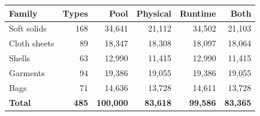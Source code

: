 \begin{tabular}{lrrrrr}
\toprule
Family & Types & Pool & Physical & Runtime & Both \\
\midrule
Soft solids & 168 & 34,641 & 21,112 & 34,502 & 21,103 \\
Cloth sheets & 89 & 18,347 & 18,308 & 18,097 & 18,064 \\
Shells & 63 & 12,990 & 11,415 & 12,990 & 11,415 \\
Garments & 94 & 19,386 & 19,055 & 19,386 & 19,055 \\
Bags & 71 & 14,636 & 13,728 & 14,611 & 13,728 \\
\textbf{Total} & \textbf{485} & \textbf{100,000} & \textbf{83,618} & \textbf{99,586} & \textbf{83,365} \\
\bottomrule
\end{tabular}
